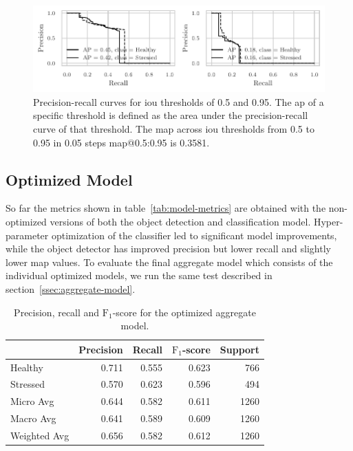 \documentclass[draft,final]{vutinfth} %
\begin{document}
\begin{figure}
  \centering
  \includegraphics{graphics/APmodel-model-optimized-relabeled.pdf}
  \caption[Aggregate model AP@0.5 and AP@0.95.]{Precision-recall
    curves for \gls{iou} thresholds of \num{0.5} and \num{0.95}. The
    \gls{ap} of a specific threshold is defined as the area under the
    precision-recall curve of that threshold. The \gls{map} across
    \gls{iou} thresholds from \num{0.5} to \num{0.95} in \num{0.05}
    steps \gls{map}@0.5:0.95 is \num{0.3581}.}
  \label{fig:aggregate-ap}
\end{figure}

\subsection{Optimized Model}
\label{ssec:model-optimized}

So far the metrics shown in table~\ref{tab:model-metrics} are obtained
with the non-optimized versions of both the object detection and
classification model. Hyper-parameter optimization of the classifier
led to significant model improvements, while the object detector has
improved precision but lower recall and slightly lower \gls{map}
values. To evaluate the final aggregate model which consists of the
individual optimized models, we run the same test described in
section~\ref{ssec:aggregate-model}.

\begin{table}
  \centering
  \begin{tabular}{lrrrr}
    \toprule
    {} &  Precision &  Recall &  $\mathrm{F}_{1}$-score &  Support \\
    \midrule
    Healthy      &      0.711 &   0.555 &     0.623 &    766 \\
    Stressed     &      0.570 &   0.623 &     0.596 &    494 \\
    Micro Avg    &      0.644 &   0.582 &     0.611 &   1260 \\
    Macro Avg    &      0.641 &   0.589 &     0.609 &   1260 \\
    Weighted Avg &      0.656 &   0.582 &     0.612 &   1260 \\
    \bottomrule
  \end{tabular}
  \caption{Precision, recall and $\mathrm{F}_1$-score for the
    optimized aggregate model.}
  \label{tab:model-metrics-hyp}
\end{table}
\end{document}
